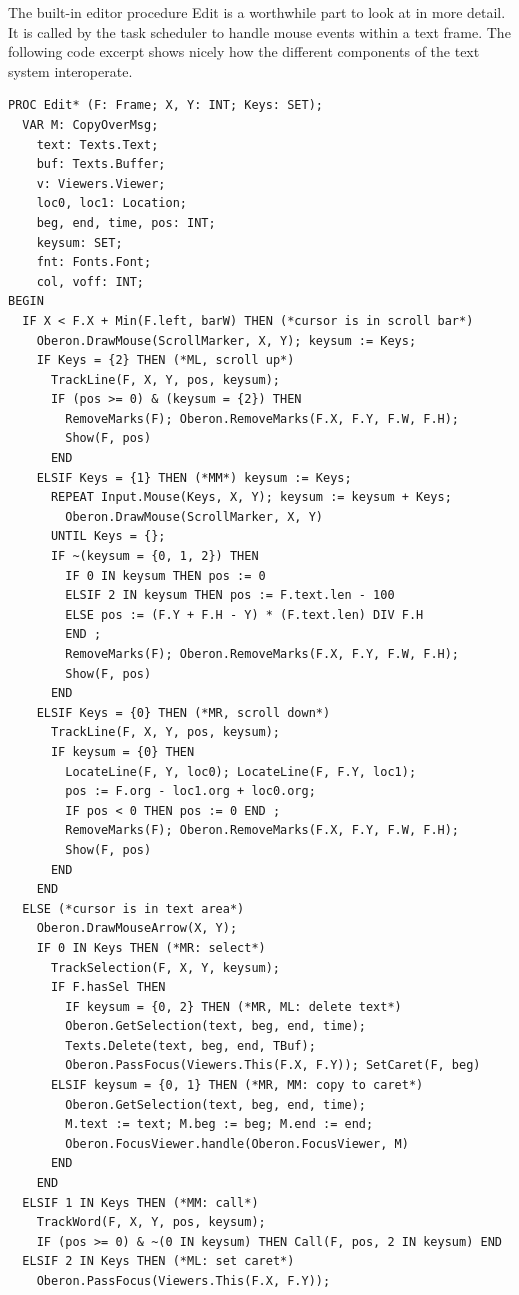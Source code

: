 The built-in editor procedure Edit is a worthwhile part to look at in more detail. It is called by the task
scheduler to handle mouse events within a text frame. The following code excerpt shows nicely
how the different components of the text system interoperate.
\begin{verbatim}
PROC Edit* (F: Frame; X, Y: INT; Keys: SET);
  VAR M: CopyOverMsg;
    text: Texts.Text;
    buf: Texts.Buffer;
    v: Viewers.Viewer;
    loc0, loc1: Location;
    beg, end, time, pos: INT;
    keysum: SET;
    fnt: Fonts.Font;
    col, voff: INT;
BEGIN
  IF X < F.X + Min(F.left, barW) THEN (*cursor is in scroll bar*)
    Oberon.DrawMouse(ScrollMarker, X, Y); keysum := Keys;
    IF Keys = {2} THEN (*ML, scroll up*)
      TrackLine(F, X, Y, pos, keysum);
      IF (pos >= 0) & (keysum = {2}) THEN
        RemoveMarks(F); Oberon.RemoveMarks(F.X, F.Y, F.W, F.H);
        Show(F, pos)
      END
    ELSIF Keys = {1} THEN (*MM*) keysum := Keys;
      REPEAT Input.Mouse(Keys, X, Y); keysum := keysum + Keys;
        Oberon.DrawMouse(ScrollMarker, X, Y)
      UNTIL Keys = {};
      IF ~(keysum = {0, 1, 2}) THEN
        IF 0 IN keysum THEN pos := 0
        ELSIF 2 IN keysum THEN pos := F.text.len - 100
        ELSE pos := (F.Y + F.H - Y) * (F.text.len) DIV F.H
        END ;
        RemoveMarks(F); Oberon.RemoveMarks(F.X, F.Y, F.W, F.H);
        Show(F, pos)
      END
    ELSIF Keys = {0} THEN (*MR, scroll down*)
      TrackLine(F, X, Y, pos, keysum);
      IF keysum = {0} THEN
        LocateLine(F, Y, loc0); LocateLine(F, F.Y, loc1);
        pos := F.org - loc1.org + loc0.org;
        IF pos < 0 THEN pos := 0 END ;
        RemoveMarks(F); Oberon.RemoveMarks(F.X, F.Y, F.W, F.H);
        Show(F, pos)
      END
    END
  ELSE (*cursor is in text area*)
    Oberon.DrawMouseArrow(X, Y);
    IF 0 IN Keys THEN (*MR: select*)
      TrackSelection(F, X, Y, keysum);
      IF F.hasSel THEN
        IF keysum = {0, 2} THEN (*MR, ML: delete text*)
        Oberon.GetSelection(text, beg, end, time);
        Texts.Delete(text, beg, end, TBuf);
        Oberon.PassFocus(Viewers.This(F.X, F.Y)); SetCaret(F, beg)
      ELSIF keysum = {0, 1} THEN (*MR, MM: copy to caret*)
        Oberon.GetSelection(text, beg, end, time);
        M.text := text; M.beg := beg; M.end := end;
        Oberon.FocusViewer.handle(Oberon.FocusViewer, M)
      END
    END
  ELSIF 1 IN Keys THEN (*MM: call*)
    TrackWord(F, X, Y, pos, keysum);
    IF (pos >= 0) & ~(0 IN keysum) THEN Call(F, pos, 2 IN keysum) END
  ELSIF 2 IN Keys THEN (*ML: set caret*)
    Oberon.PassFocus(Viewers.This(F.X, F.Y));

\end{verbatim}
